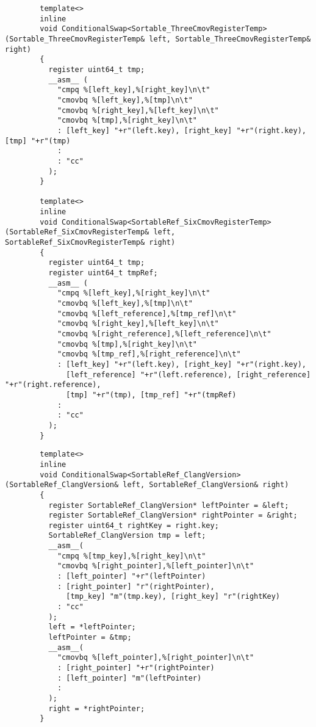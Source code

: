 \documentclass[12pt, a4paper]{article}
\begin{document}
	\begin{verbatim}
		template<>
		inline
		void ConditionalSwap<Sortable_ThreeCmovRegisterTemp>(Sortable_ThreeCmovRegisterTemp& left, Sortable_ThreeCmovRegisterTemp& right)
		{
		  register uint64_t tmp; 
		  __asm__ ( 
		    "cmpq %[left_key],%[right_key]\n\t" 
		    "cmovbq %[left_key],%[tmp]\n\t"
		    "cmovbq %[right_key],%[left_key]\n\t" 
		    "cmovbq %[tmp],%[right_key]\n\t"
		    : [left_key] "+r"(left.key), [right_key] "+r"(right.key), [tmp] "+r"(tmp)
		    : 
		    : "cc" 
		  ); 
		}
		
		template<>
		inline
		void ConditionalSwap<SortableRef_SixCmovRegisterTemp>(SortableRef_SixCmovRegisterTemp& left, SortableRef_SixCmovRegisterTemp& right)
		{
		  register uint64_t tmp;
		  register uint64_t tmpRef;
		  __asm__ ( 
		    "cmpq %[left_key],%[right_key]\n\t" 
		    "cmovbq %[left_key],%[tmp]\n\t"
		    "cmovbq %[left_reference],%[tmp_ref]\n\t"
		    "cmovbq %[right_key],%[left_key]\n\t" 
		    "cmovbq %[right_reference],%[left_reference]\n\t"
		    "cmovbq %[tmp],%[right_key]\n\t"
		    "cmovbq %[tmp_ref],%[right_reference]\n\t"
		    : [left_key] "+r"(left.key), [right_key] "+r"(right.key), 
		      [left_reference] "+r"(left.reference), [right_reference] "+r"(right.reference), 
		      [tmp] "+r"(tmp), [tmp_ref] "+r"(tmpRef)
		    : 
		    : "cc" 
		  ); 
		}
	\end{verbatim}
	\pagebreak
	\begin{verbatim}
		template<>
		inline
		void ConditionalSwap<SortableRef_ClangVersion>(SortableRef_ClangVersion& left, SortableRef_ClangVersion& right)
		{
		  register SortableRef_ClangVersion* leftPointer = &left;
		  register SortableRef_ClangVersion* rightPointer = &right;
		  register uint64_t rightKey = right.key;
		  SortableRef_ClangVersion tmp = left;
		  __asm__(
		    "cmpq %[tmp_key],%[right_key]\n\t"
		    "cmovbq %[right_pointer],%[left_pointer]\n\t"
		    : [left_pointer] "+r"(leftPointer)
		    : [right_pointer] "r"(rightPointer), 
		      [tmp_key] "m"(tmp.key), [right_key] "r"(rightKey)
		    : "cc"
		  );
		  left = *leftPointer;
		  leftPointer = &tmp;
		  __asm__(
		    "cmovbq %[left_pointer],%[right_pointer]\n\t"
		    : [right_pointer] "+r"(rightPointer)
		    : [left_pointer] "m"(leftPointer)
		    :
		  );
		  right = *rightPointer;
		}
	\end{verbatim}
\end{document}
